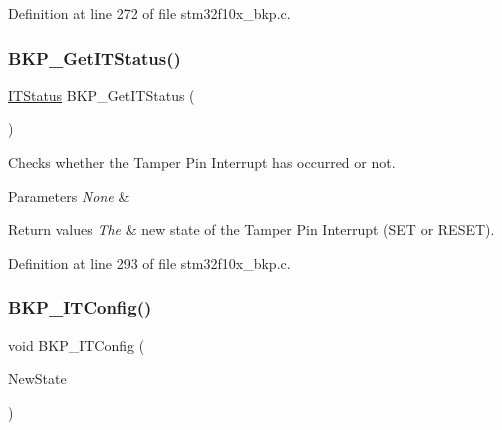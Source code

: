 Definition at line 272 of file stm32f10x\+\_\+bkp.\+c.

\mbox{\label{group___b_k_p___exported___functions_ga99566c9f1f17f499020606cb63511494}} 
\subsubsection{\texorpdfstring{B\+K\+P\+\_\+\+Get\+I\+T\+Status()}{BKP\_GetITStatus()}}
{\footnotesize\ttfamily \hyperlink{group___exported__types_gaacbd7ed539db0aacd973a0f6eca34074}{I\+T\+Status} B\+K\+P\+\_\+\+Get\+I\+T\+Status (\begin{DoxyParamCaption}\item[{void}]{ }\end{DoxyParamCaption})}



Checks whether the Tamper Pin Interrupt has occurred or not. 


\begin{DoxyParams}{Parameters}
{\em None} & \\
\hline
\end{DoxyParams}

\begin{DoxyRetVals}{Return values}
{\em The} & new state of the Tamper Pin Interrupt (S\+ET or R\+E\+S\+ET). \\
\hline
\end{DoxyRetVals}


Definition at line 293 of file stm32f10x\+\_\+bkp.\+c.

\mbox{\label{group___b_k_p___exported___functions_gab8dbd0c4773f6edb98a28c8ff6a2ead0}} 
\subsubsection{\texorpdfstring{B\+K\+P\+\_\+\+I\+T\+Config()}{BKP\_ITConfig()}}
{\footnotesize\ttfamily void B\+K\+P\+\_\+\+I\+T\+Config (\begin{DoxyParamCaption}\item[{\hyperlink{group___exported__types_gac9a7e9a35d2513ec15c3b537aaa4fba1}{Functional\+State}}]{New\+State }\end{DoxyParamCaption})}




